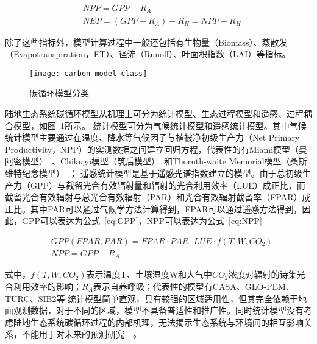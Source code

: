 \begin{align}
    & NPP = GPP-R_A
    \label{eq:NPP} \\
    & NEP = \left(GPP-R_A\right)-R_H = NPP-R_H
    \label{eq:NEP}
\end{align}

除了这些指标外，模型计算过程中一般还包括有生物量（Biomass）、蒸散发（Evapotranspiration，ET）、径流（Runoff）、叶面积指数（LAI）等指标。

\begin{figure}[!htbp]
    \centering
    \texttt{[image: carbon-model-class]}
    \caption{碳循环模型分类}
    \label{fig:carbon-model-class}
\end{figure}

陆地生态系统碳循环模型从机理上可分为统计模型、生态过程模型和遥感、过程耦合模型，如图~\ref{fig:carbon-model-class}所示。
统计模型可分为气候统计模型和遥感统计模型。其中气候统计模型主要通过在温度、降水等气候因子与植被净初级生产力（Net Primary Productivity，NPP）的实测数据之间建立回归方程，代表性的有Miami模型（曼阿密模型）~\cite{lieth1975modeling}、Chikugo模型（筑后模型）~\cite{seino1985agroclimatic}和Thornth-waite Memorial模型（桑斯维特纪念模型）~\cite{hai2012change}；
遥感统计模型是基于遥感光谱指数建立的模型。由于总初级生产力（GPP）与截留光合有效辐射量和辐射的光合利用效率（LUE）成正比，而截留光合有效辐射与总光合有效辐射（PAR）和光合有效辐射截留率（FPAR）成正比。其中PAR可以通过气候学方法计算得到，FPAR可以通过遥感方法得到，因此，GPP可以表达为公式~\ref{eq:GPP}，NPP可以表达为公式~\ref{eq:NPP}

\begin{align}
    &GPP(FPAR, PAR) = FPAR \cdot PAR \cdot LUE \cdot f(T, W, CO_2)
    \label{eq:GPP}  \\
    &NPP = GPP - R_A
    \label{eq:NPP}
\end{align}

式中，$f(T, W, CO_2)$表示温度T、土壤湿度W和大气中$CO_2$浓度对辐射的诗集光合利用效率的影响；$R_A$表示自养呼吸；代表性的模型有CASA、GLO-PEM、TURC、SIB2等
统计模型简单直观，具有较强的区域适用性，但其完全依赖于地面观测数据，对于不同的区域，模型不具备普适性和推广性。同时统计模型没有考虑陆地生态系统碳循环过程的内部机理，无法揭示生态系统与环境间的相互影响关系，不能用于对未来的预测研究~\cite{2014-yuanwenping}~\cite{xieqinyao}。

